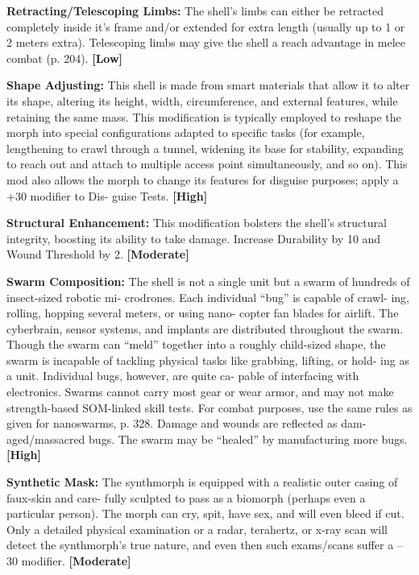 \textbf{Retracting/Telescoping Limbs:} The shell's limbs can 
either be retracted completely inside it's frame and/or 
extended for extra length (usually up to 1 or 2 meters 
extra). Telescoping limbs may give the shell a reach 
advantage in melee combat (p. 204). \textbf{[Low]}

\textbf{Shape Adjusting:} This shell is made from smart 
materials that allow it to alter its shape, altering its 
height, width, circumference, and external features, 
while retaining the same mass. This modification is 
typically employed to reshape the morph into special 
configurations adapted to specific tasks (for example, 
lengthening to crawl through a tunnel, widening its 
base for stability, expanding to reach out and attach 
to multiple access point simultaneously, and so on). 
This mod also allows the morph to change its features 
for disguise purposes; apply a +30 modifier to Dis-
guise Tests. \textbf{[High]}

\textbf{Structural Enhancement:} This modification bolsters 
the shell's structural integrity, boosting its ability to 
take damage. Increase Durability by 10 and Wound 
Threshold by 2. \textbf{[Moderate]}

\textbf{Swarm Composition:} The shell is not a single unit 
but a swarm of hundreds of insect-sized robotic mi-
crodrones. Each individual ``bug'' is capable of crawl-
ing, rolling, hopping several meters, or using nano-
copter fan blades for airlift. The cyberbrain, sensor 
systems, and implants are distributed throughout the 
swarm. Though the swarm can ``meld'' together into 
a roughly child-sized shape, the swarm is incapable of 
tackling physical tasks like grabbing, lifting, or hold-
ing as a unit. Individual bugs, however, are quite ca-
pable of interfacing with electronics. Swarms cannot 
carry most gear or wear armor, and may not make 
strength-based SOM-linked skill tests. For combat 
purposes, use the same rules as given for nanoswarms, 
p. 328. Damage and wounds are reflected as dam-
aged/massacred bugs. The swarm may be ``healed'' by 
manufacturing more bugs.\textbf{[High]}

\textbf{Synthetic Mask:} The synthmorph is equipped 
with a realistic outer casing of faux-skin and care-
fully sculpted to pass as a biomorph (perhaps even a 
particular person). The morph can cry, spit, have sex, 
and will even bleed if cut. Only a detailed physical 
examination or a radar, terahertz, or x-ray scan will 
detect the synthmorph's true nature, and even then 
such exams/scans suffer a –30 modifier. \textbf{[Moderate]}

